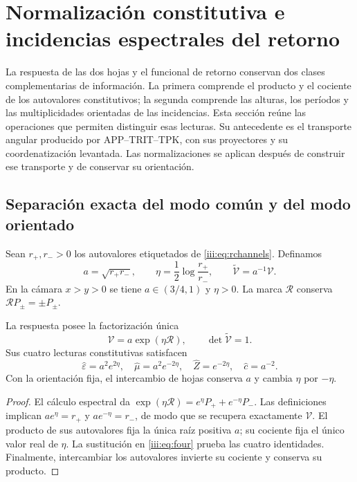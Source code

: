 \section{Normalización constitutiva e incidencias espectrales del retorno}
\label{iii:sec:incidencias-espectrales}

La respuesta de las dos hojas y el funcional de retorno conservan dos
clases complementarias de información. La primera comprende el producto
y el cociente de los autovalores constitutivos; la segunda comprende las
alturas, los períodos y las multiplicidades orientadas de las incidencias.
Esta sección reúne las operaciones que permiten distinguir esas lecturas.
Su antecedente es el transporte angular producido por APP--TRIT--TPK,
con sus proyectores y su coordenatización levantada. Las normalizaciones se aplican
después de construir ese transporte y de conservar su orientación.

\subsection{Separación exacta del modo común y del modo orientado}

Sean $r_+,r_->0$ los autovalores etiquetados de
\eqref{iii:eq:rchannels}. Definamos
\begin{equation}
 a=\sqrt{r_+r_-},\qquad
 \eta=\frac12\log\frac{r_+}{r_-},\qquad
 \widetilde{\mathcal V}=a^{-1}\mathcal V.
 \label{iii:eq:rec27-normalizacion}
\end{equation}
En la cámara $x>y>0$ se tiene $a\in(3/4,1)$ y $\eta>0$.
La marca $\mathcal R$ conserva $\mathcal R P_\pm=\pm P_\pm$.

\begin{proposition}
\label{iii:prop:rec27-factorizacion}
La respuesta posee la factorización única
\begin{equation}
 \mathcal V=a\exp(\eta\mathcal R),\qquad
 \det\widetilde{\mathcal V}=1.
 \label{iii:eq:rec27-unimodular}
\end{equation}
Sus cuatro lecturas constitutivas satisfacen
\begin{equation}
 \widehat\varepsilon=a^2e^{2\eta},\quad
 \widehat\mu=a^2e^{-2\eta},\quad
 \widehat Z=e^{-2\eta},\quad
 \widehat c=a^{-2}.
 \label{iii:eq:rec27-cuatro}
\end{equation}
Con la orientación fija, el intercambio de hojas conserva $a$ y cambia
$\eta$ por $-\eta$.
\end{proposition}
\begin{proof}
El cálculo espectral da
$\exp(\eta\mathcal R)=e^\eta P_++e^{-\eta}P_-$.
Las definiciones implican $ae^\eta=r_+$ y $ae^{-\eta}=r_-$,
de modo que se recupera exactamente $\mathcal V$.
El producto de sus autovalores fija la única raíz positiva $a$;
su cociente fija el único valor real de $\eta$.
La sustitución en \eqref{iii:eq:four} prueba las cuatro identidades.
Finalmente, intercambiar los autovalores invierte su cociente y conserva
su producto.
\end{proof}

